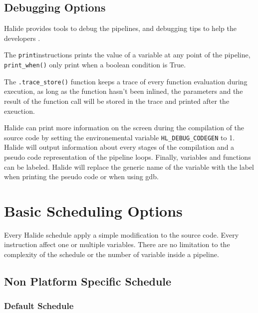 \subsection{Debugging Options}

	Halide provides tools to debug the pipelines, and debugging tips to help the developers \cite{Web:HalideDebug}.

	The \texttt{print}instructions prints the value of a variable at any point of the pipeline, \texttt{print\_when()} only print when a boolean condition is True.

	The  \verb|.trace_store()| function keeps a trace of every function evaluation during execution, as long as the function hasn't been inlined, the parameters and the result of the function call will be stored in the trace and printed after the exeuction.

	Halide can print more information on the screen during the compilation of the source code by setting the environemental variable \verb|HL_DEBUG_CODEGEN| to 1. Halide will output information about every stages of the compilation and a pseudo code representation of the pipeline loops. 
	Finally, variables and functions can be labeled. Halide will replace the generic name of the variable with the label when printing the pseudo code or when using gdb.

	\section {Basic Scheduling Options}
	\label{section:scheduling}
	Every Halide schedule apply a simple modification to the source code. Every instruction affect one or multiple variables. There are no limitation to the complexity of the schedule or the number of variable inside a pipeline.

\newcommand\EIW{.4\textwidth}
\newcommand\ECW{\textwidth - \EIW}
	\subsection{ Non Platform Specific Schedule}

	\subsubsection{Default Schedule}


